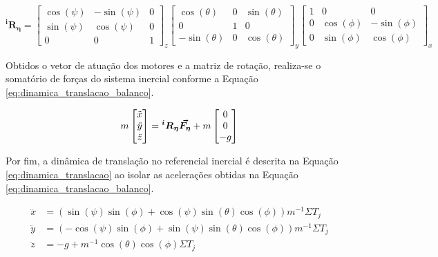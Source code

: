\documentclass[main.tex]{subfiles}
\begin{document}
\begin{equation}\label{eq:rotational_matrix_raw}
    \boldsymbol{^iR_\eta} = 
     \begin{bmatrix}
        \cos(\psi)  &   -\sin(\psi) &   0\\
        \sin(\psi)  &   \cos(\psi)  &   0\\
        0           &   0           &   1
    \end{bmatrix}_z
    \begin{bmatrix}
        \cos(\theta)    &   0             &   \sin(\theta)  \\
        0               &   1               &   0           \\
        -\sin(\theta)   &   0             &   \cos(\theta)
    \end{bmatrix}_y
   \begin{bmatrix}
        1           &   0           &   0               \\
        0           &   \cos(\phi)  &   -\sin(\phi)   \\
        0           &   \sin(\phi)  &   \cos(\phi)
    \end{bmatrix}_x
\end{equation}

Obtidos o vetor de atuação dos motores e a matriz de rotação, realiza-se o somatório de forças do sistema inercial conforme a Equação \ref{eq:dinamica_translacao_balanco}.

\begin{equation}\label{eq:dinamica_translacao_balanco}
    m \begin{bmatrix}
        \Ddot{x}\\
        \Ddot{y}\\
        \Ddot{z}
    \end{bmatrix} = \boldsymbol{^iR_\eta}\boldsymbol{\vec{F_\eta}} + m
    \begin{bmatrix}
        0\\
        0\\
        -g
    \end{bmatrix}
\end{equation}

Por fim, a dinâmica de translação no referencial inercial é descrita na Equação \ref{eq:dinamica_translacao} ao isolar as acelerações obtidas na Equação \ref{eq:dinamica_translacao_balanco}.

\begin{equation}\label{eq:dinamica_translacao}
    \begin{split}
        \ddot{x} &= (\sin{(\psi)}\sin{(\phi)} + \cos{(\psi)}\sin{(\theta)}\cos{(\phi)})m^{-1}\Sigma T_j\\
        \ddot{y} &= (-\cos{(\psi)}\sin{(\phi)} + \sin{(\psi)}\sin{(\theta)}\cos{(\phi)})m^{-1}\Sigma T_j\\
        \ddot{z} &= -g + m^{-1}\cos{(\theta)}\cos{(\phi)}\Sigma T_j\\
    \end{split}
\end{equation}
\end{document}
